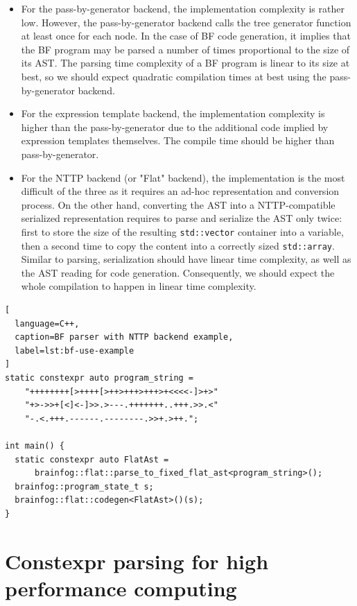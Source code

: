 \documentclass[../../main.tex]{subfiles}
\begin{document}
\begin{itemize}
\item For the pass-by-generator backend, the implementation complexity is
rather low. However, the pass-by-generator backend calls the tree
generator function at least once for each node. In the
case of BF code generation, it implies that the BF program may be parsed a
number of times proportional to the size of its AST. The parsing time complexity
of a BF program is linear to its size at best, so we should expect
quadratic compilation times at best using the pass-by-generator backend.\\

\item For the expression template backend, the implementation complexity is
higher than the pass-by-generator due to the additional code implied by expression
templates themselves. The compile time should be higher than pass-by-generator.\\

\item For the NTTP backend (or "Flat" backend), the implementation is the most
difficult of the three as it requires an ad-hoc representation and conversion
process.
On the other hand, converting the AST into a NTTP-compatible serialized
representation requires to parse and serialize the AST only twice: first to
store the size of the resulting \lstinline|std::vector| container into a
\constexpr variable, then a second time to copy the content into a
correctly sized \lstinline|std::array|. Similar to parsing, serialization should
have linear time complexity, as well as the AST reading for code generation.
Consequently, we should expect the whole compilation to happen in linear
time complexity.
\end{itemize}

\begin{lstlisting}[
  language=C++,
  caption=BF parser with NTTP backend example,
  label=lst:bf-use-example
]
static constexpr auto program_string =
    "++++++++[>++++[>++>+++>+++>+<<<<-]>+>"
    "+>->>+[<]<-]>>.>---.+++++++..+++.>>.<"
    "-.<.+++.------.--------.>>+.>++.";

int main() {
  static constexpr auto FlatAst =
      brainfog::flat::parse_to_fixed_flat_ast<program_string>();
  brainfog::program_state_t s;
  brainfog::flat::codegen<FlatAst>()(s);
}
\end{lstlisting}

\section{Constexpr parsing for high performance computing}
\end{document}
